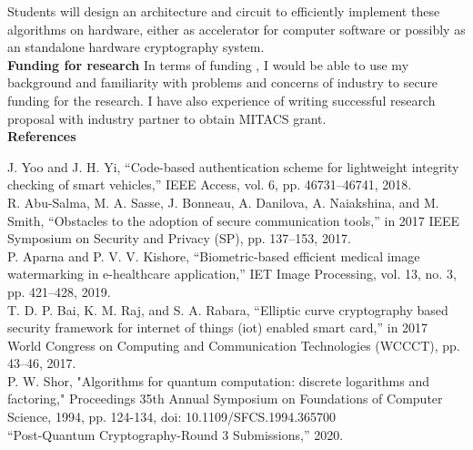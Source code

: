 \documentclass[12pt,oneside]{book}
\begin{document}
Students will design an architecture and circuit to efficiently implement  these algorithms on hardware, either as accelerator for computer software or possibly as an standalone hardware cryptography system.
\\{\bf Funding for research }
In terms of funding , I would be able to use my background and familiarity with problems and concerns of industry to secure funding for the research. I have also experience of writing successful research proposal with industry partner to obtain MITACS grant. \\ 
\hspace*{-1.8em}
{\bf References} \\
{\footnotesize
\phantom \quad [1] J. Yoo and J. H. Yi, “Code-based authentication scheme for lightweight integrity checking of smart vehicles,” IEEE Access,
vol. 6, pp. 46731–46741, 2018.\\[-0.1em]
\phantom \quad [2] R. Abu-Salma, M. A. Sasse, J. Bonneau, A. Danilova, A. Naiakshina, and M. Smith, “Obstacles to the adoption of secure
communication tools,” in 2017 IEEE Symposium on Security and Privacy (SP), pp. 137–153, 2017.\\[-0.1em]
\phantom \quad [3] P. Aparna and P. V. V. Kishore, “Biometric-based efficient medical image watermarking in e-healthcare application,” IET
Image Processing, vol. 13, no. 3, pp. 421–428, 2019.\\[-0.1em]
\phantom \quad [4] T. D. P. Bai, K. M. Raj, and S. A. Rabara, “Elliptic curve cryptography based security framework for internet of things (iot)
enabled smart card,” in 2017 World Congress on Computing and Communication Technologies (WCCCT), pp. 43–46, 2017.\\[-0.1em]
\phantom \quad [5] P. W. Shor, "Algorithms for quantum computation: discrete logarithms and factoring," Proceedings 35th Annual Symposium on Foundations of Computer Science, 1994, pp. 124-134, doi: 10.1109/SFCS.1994.365700\\[-0.1em]
\phantom \quad [6] “Post-Quantum Cryptography-Round 3 Submissions,” 2020.

}
\newpage
 \thispagestyle{empty}
 \phantom \quad \\
 
\end{document}
